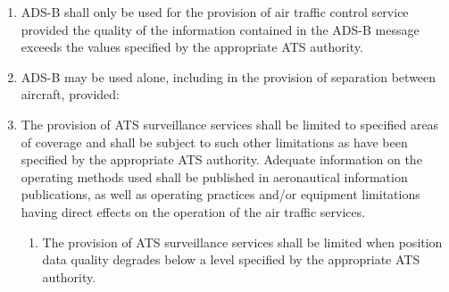 \documentclass[../vATM.tex]{subfiles}
\begin{document}
\begin{enumerate}[label=\arabic{section}.\arabic{subsection}.\arabic*]

        \item ADS-B shall only be used for the provision of air traffic control service provided the quality of the information contained in the ADS-B message exceeds the values specified by the appropriate ATS authority.
        \item ADS-B may be used alone, including in the provision of separation between aircraft, provided:


        \item The provision of ATS surveillance services shall be limited to specified areas of coverage and shall be subject to such other limitations as have been specified by the appropriate ATS authority. Adequate information on the operating methods used shall be published in aeronautical information publications, as well as operating practices and/or equipment limitations having direct effects on the operation of the air traffic services.


        \begin{enumerate}[label=\arabic{section}.\arabic{subsection}.\arabic{enumi}.\arabic*]
            \item The provision of ATS surveillance services shall be limited when position data quality degrades below a level specified by the appropriate ATS authority.
        \end{enumerate}


\end{enumerate}
\end{document}

